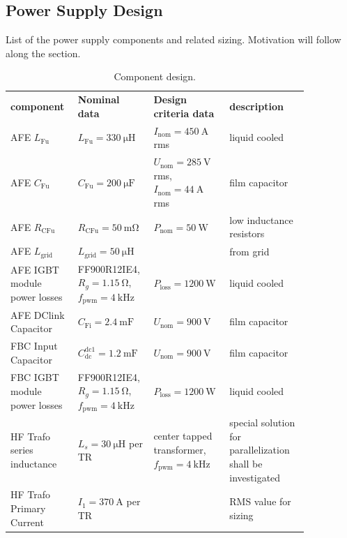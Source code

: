 \documentclass[11pt,a4paper]{scrartcl}
\begin{document}
\begin{onehalfspace}
\section{Power Supply Design}\label{sec:topology}

List of the power supply components and related sizing. Motivation will follow along the section.
 \begin{center}	
	\onehalfspacing
	\begin{longtable}{p{0.2\linewidth}|p{0.2\linewidth}|p{0.2\linewidth}|p{0.25\linewidth}}
		\captionsetup{width=0.65\textwidth, font=small}
		\caption{Component design.}
		\label{table:design} \\
		\toprule
		\textbf{component} & \textbf{Nominal data}  & \textbf{Design criteria data}  & \textbf{description} \\
		\midrule
		AFE $L_\text{Fu}$ & $L_\text{Fu} = \SI{330}{\micro\henry}$ & $I_\text{nom} = \SI{450}{\ampere}$ rms & liquid cooled \\	
		\midrule	
		AFE $C_\text{Fu}$ & $C_\text{Fu} = \SI{200}{\micro\farad}$ & $U_\text{nom} = \SI{285}{\volt}$ rms, $I_\text{nom} = \SI{44}{\ampere}$ rms & film capacitor \\		
		\midrule
		AFE $R_\text{CFu}$ & $R_\text{CFu} = \SI{50}{\milli\ohm}$ & $P_\text{nom} = \SI{50}{\watt}$ & low inductance resistors \\
		\midrule
		AFE $L_\text{grid}$ & $L_\text{grid} = \SI{50}{\micro\henry}$ &  & from grid \\
		\midrule
		AFE IGBT module power losses & FF900R12IE4, $R_g = \SI{1.15}{\ohm}$, $f_\text{pwm} = \SI{4}{\kilo\hertz}$ & $P_\text{loss} = \SI{1200}{\watt}$   & liquid cooled \\
		\midrule
		AFE DClink Capacitor & $C_\text{Fi} = \SI{2.4}{\milli\farad}$ & $U_\text{nom} = \SI{900}{\volt}$  & film capacitor \\
		\midrule
		FBC Input Capacitor & $C_\text{dc}^\text{dc1} = \SI{1.2}{\milli\farad}$ & $U_\text{nom} = \SI{900}{\volt}$  & film capacitor \\
		\midrule
		FBC IGBT module power losses & FF900R12IE4, $R_g = \SI{1.15}{\ohm}$, $f_\text{pwm} = \SI{4}{\kilo\hertz}$ & $P_\text{loss} = \SI{1200}{\watt}$  & liquid cooled \\
		\midrule
		HF Trafo series inductance & $L_s = \SI{30}{\micro\henry}$ per TR & center tapped transformer, $f_\text{pwm} = \SI{4}{\kilo\hertz}$ & special solution for parallelization shall be investigated \\
		\midrule
		HF Trafo Primary Current & $I_1 = \SI{370}{\ampere}$ per TR &  & RMS value for sizing  \\		

\end{longtable}
\end{center}
\end{onehalfspace}
\end{document}
